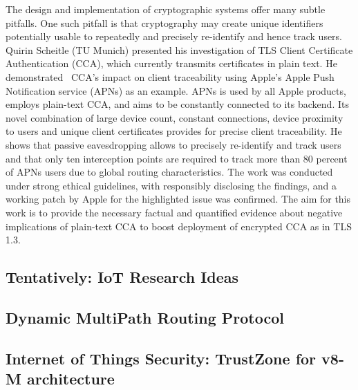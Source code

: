 The design and implementation of cryptographic systems offer many subtle
pitfalls. One such pitfall is that cryptography may create unique identifiers
potentially usable to repeatedly and precisely re-identify and hence track
users. Quirin Scheitle (TU Munich) presented his investigation of TLS Client
Certificate Authentication (CCA), which currently transmits certificates in
plain text. He demonstrated~\cite{qscheitle:tma:2017} CCA’s impact on client
traceability using Apple’s Apple Push Notification service (APNs) as an
example. APNs is used by all Apple products, employs plain-text CCA, and aims
to be constantly connected to its backend. Its novel combination of large
device count, constant connections, device proximity to users and unique
client certificates provides for precise client traceability. He shows that
passive eavesdropping allows to precisely re-identify and track users and that
only ten interception points are required to track more than 80 percent of
APNs users due to global routing characteristics. The work was conducted under
strong ethical guidelines, with responsibly disclosing the findings, and a
working patch by Apple for the highlighted issue was confirmed. The aim for
this work is to provide the necessary factual and quantified evidence about
negative implications of plain-text CCA to boost deployment of encrypted CCA
as in TLS 1.3.

\subsection{Tentatively: IoT Research Ideas}

\subsection{Dynamic MultiPath Routing Protocol}

\subsection{Internet of Things Security: TrustZone for v8-M architecture}

